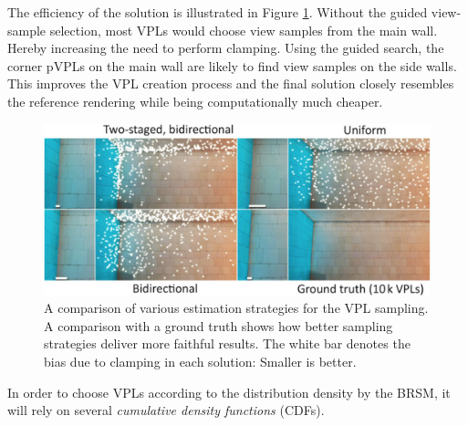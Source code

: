 The efficiency of the solution is illustrated in Figure \ref{f:adaptive-ISMs-3}. Without the guided view-sample selection, most VPLs would choose view samples from the main wall. Hereby increasing the need to perform clamping. Using the guided search, the corner pVPLs on the main wall are likely to find view samples on the side walls. This improves the VPL creation process and the final solution closely resembles the reference rendering while being computationally much cheaper.

\begin{figure}\label{f:adaptive-ISMs-3}
	\begin{center}
		\includegraphics[width=1.\textwidth]{graphics/ir/ir-5-3}
	\end{center}
	\caption{A comparison of various estimation strategies for the VPL sampling. A comparison with a ground truth shows how better sampling strategies deliver more faithful results. The white bar denotes the bias due to clamping in each solution: Smaller is better.}
\end{figure}


In order to choose VPLs according to the distribution density by the BRSM, it will rely on several \textit{cumulative density functions} (CDFs).

